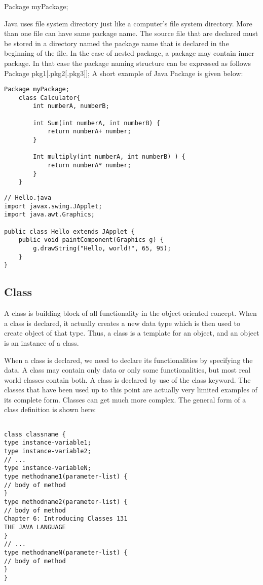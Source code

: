 \documentclass[12pt]{report}
\begin{document}
Package myPackage; 

Java uses file system directory just like a computer’s file system directory. More than one file can have same package name. The source file that are declared must be stored in a directory named the package name that is declared in the beginning of the file. 
In the case of nested package, a package may contain inner package. In that case the package naming structure can be expressed as follows 
Package pkg1[.pkg2[.pkg3]]; 
A short example of Java Package is given below:

\begin{lstlisting}
Package myPackage;
	class Calculator{
		int numberA, numberB;
			
		int Sum(int numberA, int numberB) {
			return numberA+ number;
		}
		
		Int multiply(int numberA, int numberB) ) {
			return numberA* number;
		}
	}

\end{lstlisting}
\begin{lstlisting}
// Hello.java
import javax.swing.JApplet;
import java.awt.Graphics;

public class Hello extends JApplet {
    public void paintComponent(Graphics g) {
        g.drawString("Hello, world!", 65, 95);
    }    
}
\end{lstlisting}

\subsection{Class}
A class is building block of all functionality in the object oriented concept. When a class is declared, it actually creates a new data type which is then used to create object of that type. Thus, a class is a template for an object, and an object is an instance of a class. 


When a class is declared, we need to declare its functionalities by specifying the data. A class may contain only data or only some functionalities, but most real world classes contain both. A class is declared by use of the class keyword. The classes that have been used up to this point are actually very limited examples of its complete form. Classes can get much more complex. The general form of a class definition is shown here:

\begin{lstlisting}

class classname {
type instance-variable1;
type instance-variable2;
// ...
type instance-variableN;
type methodname1(parameter-list) {
// body of method
}
type methodname2(parameter-list) {
// body of method
Chapter 6: Introducing Classes 131
THE JAVA LANGUAGE
}
// ...
type methodnameN(parameter-list) {
// body of method
}
}

\end{lstlisting}
\end{document}

